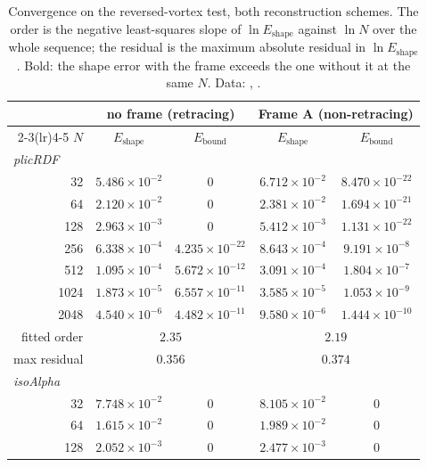 \begin{table}[htbp]
\centering
\small
\setlength{\tabcolsep}{4pt}
\caption{Convergence on the reversed-vortex test, both reconstruction schemes. The order is the negative least-squares slope of $\ln E_{\text{shape}}$ against $\ln N$ over the whole sequence; the residual is the maximum absolute residual in $\ln E_{\text{shape}}$. Bold: the shape error with the frame exceeds the one without it at the same $N$. Data: \cite{bothe2026figshare}, \protect{}.}
\label{tab:conv}
\begin{tabular}{r cc cc}
\toprule
& \multicolumn{2}{c}{no frame (retracing)} & \multicolumn{2}{c}{Frame A (non-retracing)} \\
\cmidrule(lr){2-3}\cmidrule(lr){4-5}
$N$ & $E_{\text{shape}}$ & $E_{\text{bound}}$ & $E_{\text{shape}}$ & $E_{\text{bound}}$ \\
\midrule
\multicolumn{5}{l}{\emph{plicRDF}} \\
32 & $5.486\times10^{-2}$ & $0$ & {\boldmath$6.712\times10^{-2}$} & $8.470\times10^{-22}$ \\
64 & $2.120\times10^{-2}$ & $0$ & {\boldmath$2.381\times10^{-2}$} & $1.694\times10^{-21}$ \\
128 & $2.963\times10^{-3}$ & $0$ & {\boldmath$5.412\times10^{-3}$} & $1.131\times10^{-22}$ \\
256 & $6.338\times10^{-4}$ & $4.235\times10^{-22}$ & {\boldmath$8.643\times10^{-4}$} & $9.191\times10^{-8}$ \\
512 & $1.095\times10^{-4}$ & $5.672\times10^{-12}$ & {\boldmath$3.091\times10^{-4}$} & $1.804\times10^{-7}$ \\
1024 & $1.873\times10^{-5}$ & $6.557\times10^{-11}$ & {\boldmath$3.585\times10^{-5}$} & $1.053\times10^{-9}$ \\
2048 & $4.540\times10^{-6}$ & $4.482\times10^{-11}$ & {\boldmath$9.580\times10^{-6}$} & $1.444\times10^{-10}$ \\
\quad fitted order & \multicolumn{2}{c}{$2.35$} & \multicolumn{2}{c}{$2.19$} \\
\quad max residual & \multicolumn{2}{c}{$0.356$} & \multicolumn{2}{c}{$0.374$} \\
\midrule
\multicolumn{5}{l}{\emph{isoAlpha}} \\
32 & $7.748\times10^{-2}$ & $0$ & {\boldmath$8.105\times10^{-2}$} & $0$ \\
64 & $1.615\times10^{-2}$ & $0$ & {\boldmath$1.989\times10^{-2}$} & $0$ \\
128 & $2.052\times10^{-3}$ & $0$ & {\boldmath$2.477\times10^{-3}$} & $0$ \\

\end{tabular}
\end{table}
